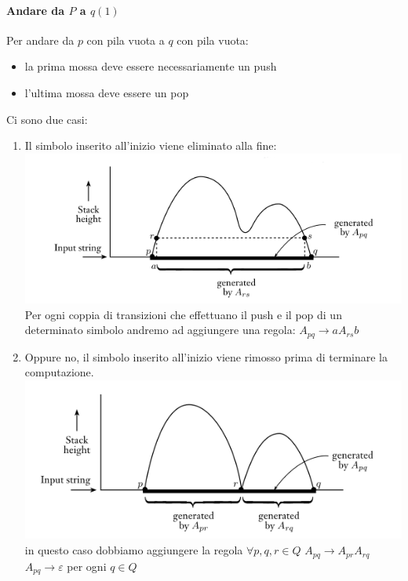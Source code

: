 \paragraph{Andare da $P$ a $q(1)$}
Per andare da $p$ con pila vuota a $q$ con pila vuota:
\begin{itemize}
	\item la prima mossa deve essere necessariamente un push 
	\item l'ultima mossa deve essere un pop
\end{itemize}
Ci sono due casi:
\begin{enumerate}
	\item Il simbolo inserito all'inizio viene eliminato alla fine:
		\includegraphics[scale=0.5]{img/da_p_a_q.png}
		Per ogni coppia di transizioni che effettuano il push e il pop di un determinato simbolo andremo ad aggiungere una regola:
		$A_{pq}\rightarrow aA_{rs}b$ 
	\item Oppure no, il simbolo inserito all'inizio viene rimosso prima di terminare la computazione.
		\includegraphics[scale=0.5]{img/da_p_a_q_2.png}
		in questo caso dobbiamo aggiungere la regola
		$\forall p,q,r\in Q$ 
		$A_{pq}\rightarrow A_{pr}A_{rq}$
		$A_{pq} \rightarrow\varepsilon$ per ogni $q\in Q$ 
\end{enumerate}


